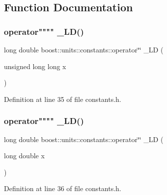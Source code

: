 \subsection{Function Documentation}
\hypertarget{namespaceboost_1_1units_1_1constants_a574260222fb41c463f65d727e71ea200}{}\label{namespaceboost_1_1units_1_1constants_a574260222fb41c463f65d727e71ea200} 
\subsubsection{\texorpdfstring{operator"""" \+\_\+\+L\+D()}{operator"" \_LD()}\hspace{0.1cm}{\footnotesize\ttfamily [1/2]}}
{\footnotesize\ttfamily long double boost\+::units\+::constants\+::operator\char`\"{}\char`\"{} \+\_\+\+LD (\begin{DoxyParamCaption}\item[{unsigned long long}]{x }\end{DoxyParamCaption})}



Definition at line 35 of file constants.\+h.

\hypertarget{namespaceboost_1_1units_1_1constants_a21be806b7651396a8d480e6e450292ab}{}\label{namespaceboost_1_1units_1_1constants_a21be806b7651396a8d480e6e450292ab} 
\subsubsection{\texorpdfstring{operator"""" \+\_\+\+L\+D()}{operator"" \_LD()}\hspace{0.1cm}{\footnotesize\ttfamily [2/2]}}
{\footnotesize\ttfamily long double boost\+::units\+::constants\+::operator\char`\"{}\char`\"{} \+\_\+\+LD (\begin{DoxyParamCaption}\item[{long double}]{x }\end{DoxyParamCaption})}



Definition at line 36 of file constants.\+h.



